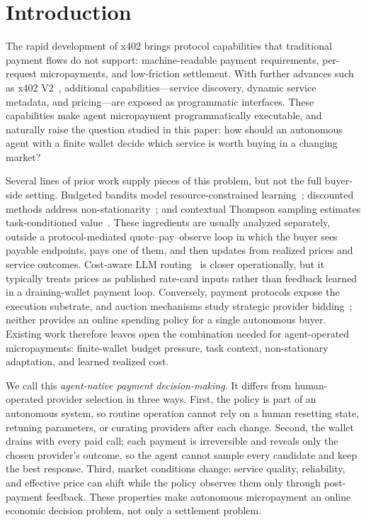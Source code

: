 \section{Introduction}
\label{sec:intro}

The rapid development of x402 brings protocol capabilities that traditional payment flows do not support: machine-readable payment requirements, per-request micropayments, and low-friction settlement. With further advances such as x402 V2~\citep{coinbase2025x402v2}, additional capabilities---service discovery, dynamic service metadata, and pricing---are exposed as programmatic interfaces. These capabilities make agent micropayment programmatically executable, and naturally raise the question studied in this paper: how should an autonomous agent with a finite wallet decide which service is worth buying in a changing market?

Several lines of prior work supply pieces of this problem, but not the full buyer-side setting. Budgeted bandits model resource-constrained learning~\citep{xia2015bts,badanidiyuru2018bandits}; discounted methods address non-stationarity~\citep{qi2023dsts}; and contextual Thompson sampling estimates task-conditioned value~\citep{agrawal2013contextualts}. These ingredients are usually analyzed separately, outside a protocol-mediated quote--pay--observe loop in which the buyer sees payable endpoints, pays one of them, and then updates from realized prices and service outcomes. Cost-aware LLM routing~\citep{chen2023frugalgpt,ong2024routellm,ding2024hybridllm,mixllm2024,llmbandit2025} is closer operationally, but it typically treats prices as published rate-card inputs rather than feedback learned in a draining-wallet payment loop. Conversely, payment protocols expose the execution substrate, and auction mechanisms study strategic provider bidding~\citep{patra2026reverseauction}; neither provides an online spending policy for a single autonomous buyer. Existing work therefore leaves open the combination needed for agent-operated micropayments: finite-wallet budget pressure, task context, non-stationary adaptation, and learned realized cost.

We call this \emph{agent-native payment decision-making}. It differs from human-operated provider selection in three ways. First, the policy is part of an autonomous system, so routine operation cannot rely on a human resetting state, retuning parameters, or curating providers after each change. Second, the wallet drains with every paid call; each payment is irreversible and reveals only the chosen provider's outcome, so the agent cannot sample every candidate and keep the best response. Third, market conditions change: service quality, reliability, and effective price can shift while the policy observes them only through post-payment feedback. These properties make autonomous micropayment an online economic decision problem, not only a settlement problem.

